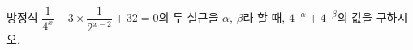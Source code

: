 방정식 $\dfrac{1}{4^x}-3\times\dfrac{1}{2^{x-2}}+32=0$의 두 실근을 $\alpha$, $\beta$라 할 때, $4^{-\alpha}+4^{-\beta}$의 값을 구하시오.
